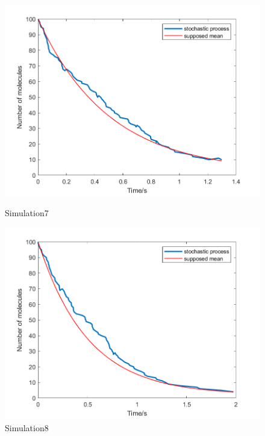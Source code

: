 \documentclass{article}
\begin{document}
\begin{figure}[htbp]
    \centering
    \begin{minipage}{0.45\linewidth}
        \centering
        \includegraphics[width=\linewidth]{graph/c7.png}
        \caption{Simulation7}
        \label{c7}
    \end{minipage}
    \hfill
    \begin{minipage}{0.45\linewidth}
        \centering
        \includegraphics[width=\linewidth]{graph/c8.png}
        \caption{Simulation8}
        \label{c8}
    \end{minipage}
\end{figure}
\end{document}
